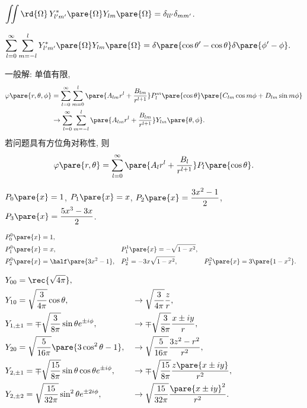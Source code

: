 \documentclass[hidelinks]{ctexart}
\begin{document}
\begin{cenum}
\begin{cenum}
        \item $\displaystyle \iint \rd{\Omega}\, Y_{l'm'}^*\pare{\Omega}Y_{lm}\pare{\Omega} = 
        \delta_{ll'}\delta_{mm'}$.
        \item $\displaystyle \sum_{l=0}^\infty \sum_{m=-l}^{l} Y_{l'm'}^*\pare{\Omega} Y_{lm}\pare{\Omega} = \delta\pare{\cos \theta' - \cos\theta} \delta\pare{\phi' - \phi}.$
    \end{cenum}
    \item 一般解: 单值有限,
    \begin{align*}
        \varphi\pare{r,\theta,\phi} &= \sum_{l=0}^\infty \sum_{m=0}^l \pare{A_{lm}r^l + \frac{B_{lm}}{r^{l+1}}}P_l^m\pare{\cos\theta}\pare{C_{lm}\cos m\phi + D_{lm}\sin m\phi} \\
        &\rightarrow \sum_{l=0}^\infty \sum_{m=-l}^l \pare{A_{lm}r^l + \frac{B_{lm}}{r^{l+1}}}Y_{lm}\pare{\theta,\phi}.
    \end{align*}
    若问题具有方位角对称性, 则
    \[ \varphi\pare{r,\theta} = \sum_{l=0}^\infty \pare{A_l r^l + \frac{B_l}{r^{l+1}}}P_l\pare{\cos\theta}. \]
\end{cenum}
\begin{ex}
    $P_0\pare{x} = 1$, $P_1\pare{x} = x$, $\displaystyle P_2\pare{x} = \frac{3x^2 - 1}{2}$, $\displaystyle P_3\pare{x} = \frac{5x^3 - 3x}{2}$.
\end{ex}
\begin{ex}
    $\displaystyle \begin{aligned}[t]
        &P_0^0 \pare{x} = 1, \\
        &P_1^0 \pare{x} = x, && P_1^1\pare{x} = -\sqrt{1-x^2}, \\
        &P_2^0 \pare{x} = \half\pare{3x^2 - 1}, && P_2^1 = -3x\sqrt{1-x^2}, && P_2^2\pare{x} = 3\pare{1-x^2}.
    \end{aligned}$
\end{ex}
\begin{ex}
    $\displaystyle \begin{aligned}[t]
        &Y_{00} = \rec{\sqrt{4\pi}}, \\
        &Y_{10} = \sqrt{\frac{3}{4\pi}}\cos\theta, && \rightarrow \sqrt{\frac{3}{4\pi}}\frac{z}{r}, \\
        & Y_{1,\pm 1} = \mp \sqrt{\frac{3}{8\pi}}\sin\theta e^{\pm i\phi}, && \rightarrow \mp\sqrt{\frac{3}{8\pi}}\frac{x\pm iy}{r}, \\
        &Y_{20} = \sqrt{\frac{5}{16\pi}}\pare{3\cos^2\theta - 1}, && \rightarrow \sqrt{\frac{5}{16\pi}}\frac{3z^2-r^2}{r^2}, \\
        & Y_{2,\pm 1} = \mp\sqrt{\frac{15}{8\pi}}\sin\theta\cos\theta e^{\pm i\phi}, && \rightarrow \mp\sqrt{\frac{15}{8\pi}}\frac{z\pare{x\pm iy}}{r^2}, \\
        & Y_{2,\pm 2} = \sqrt{\frac{15}{32\pi}}\sin^2\theta e^{\pm 2i\phi}, && \rightarrow \sqrt{\frac{15}{32\pi}}\frac{\pare{x\pm iy}^2}{r^2}.
    \end{aligned}$
\end{ex}
\end{document}
